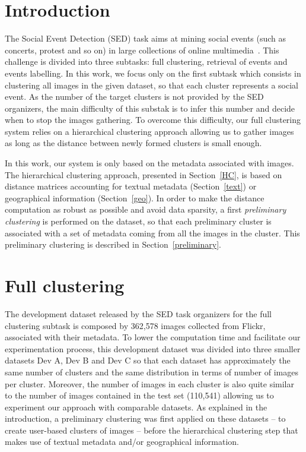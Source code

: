 \documentclass{acm_proc_article-me11_tweaked}
\begin{document}
\section{Introduction}
The Social Event Detection (SED) task aims at mining social events (such as concerts, protest and so on) in large collections of online multimedia~\cite{PPM+14}. This challenge is divided into three subtasks: full clustering, retrieval of events and events labelling. 
In this work, we focus only on the first subtask which consists in clustering all images in the given dataset, so that each cluster represents a social event. 
As the number of the target clusters is not provided by the SED organizers, the main difficulty of this substak is to infer this number and decide when to stop the images gathering.
To overcome this difficulty, our full clustering system relies on a hierarchical clustering approach allowing us to gather images as long as the distance between newly formed clusters is small enough.

In this work, our system is only based on the metadata associated with images. The hierarchical clustering approach, presented in Section~\ref{HC}, is based on distance matrices accounting for textual metadata (Section~\ref{text}) or geographical information (Section~\ref{geo}). In order to make the distance computation as robust as possible and avoid data sparsity, a first \textit{preliminary clustering} is performed on the dataset, so that each preliminary cluster is associated with a set of metadata coming from all the images in the cluster. This preliminary clustering is described in Section~\ref{preliminary}.

\section{Full clustering}

The development dataset released by the SED task organizers for the full clustering subtask is composed by 362,578 images collected from Flickr, associated with their metadata.  
To lower the computation time and facilitate our experimentation process, this development dataset was divided into three smaller datasets Dev A, Dev B and Dev C so that each dataset has approximately the same number of clusters and the same distribution in terms of number of images per cluster. Moreover, the number of images in each cluster is also quite similar to the number of images contained in the test set (110,541) allowing us to experiment our approach with comparable datasets. 
As explained in the introduction, a preliminary clustering was first applied on these datasets -- to create user-based clusters of images -- before the hierarchical clustering step that makes use of textual metadata and/or geographical information.
\end{document}
